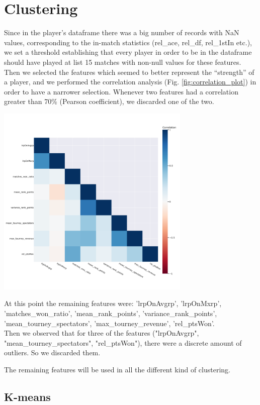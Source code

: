 \documentclass{article}
\begin{document}
\section{Clustering}
Since in the player's dataframe there was a big number of records with NaN values, corresponding to the in-match statistics (rel\_ace, rel\_df, rel\_1stIn etc.), we set a threshold establishing that every player in order to be in the dataframe should have played at list 15 matches with non-null values for these features.
Then we selected the features which seemed to better represent the “strength” of a player, and we performed the correlation analysis (Fig. \ref{fig:correlation_plot}) in order to have a narrower selection. Whenever two features had a correlation greater than 70\% (Pearson coefficient), we discarded one of the two. 
\begin{center}
    \includegraphics[width=350px]{correlation_plot}
    \label{fig:correlation_plot}
\end{center}
At this point the remaining features were: 'lrpOnAvgrp', 'lrpOnMxrp', 'matches\_won\_ratio', 'mean\_rank\_points', 'variance\_rank\_points', 'mean\_tourney\_spectators', 'max\_tourney\_revenue', 'rel\_ptsWon'.\\

Then we observed that for three of the features ("lrpOnAvgrp", "mean\_tourney\_spectators", "rel\_ptsWon"), there were a discrete amount of outliers. So we discarded them.

The remaining features will be used in all the different kind of clustering.

\subsection{K-means}
\end{document}
